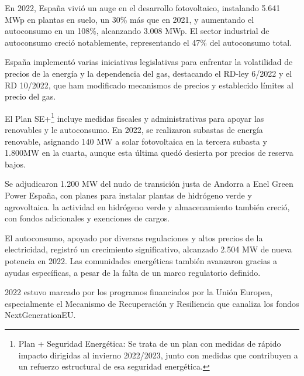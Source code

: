 En 2022, España vivió un auge en el desarrollo fotovoltaico, instalando 5.641 MWp en plantas en suelo, un 30\% más que en 2021, y aumentando el autoconsumo en un 108\%, alcanzando 3.008 MWp. El sector industrial de autoconsumo creció notablemente, representando el 47\% del autoconsumo total.

España implementó varias iniciativas legislativas para enfrentar la volatilidad de precios de la energía y la dependencia del gas, destacando el RD-ley 6/2022\cite{boe622} y el RD 10/2022\cite{boe1022}, que ham modificado mecanismos de precios y establecido límites al precio del gas.

El Plan SE+\footnote{Plan + Seguridad Energética: Se trata de un plan con medidas de rápido impacto dirigidas al invierno 2022/2023, junto con medidas que contribuyen a un refuerzo estructural de esa seguridad energética.}\cite{demografico22} incluye medidas fiscales y administrativas para apoyar las renovables y le autoconsumo. En 2022, se realizaron subastas de energía renovable, asignando 140 MW a solar fotovoltaica en la tercera subasta y 1.800MW en la cuarta, aunque esta última quedó desierta por precios de reserva bajos.

Se adjudicaron 1.200 MW del nudo de transición justa de Andorra a Enel Green Power España, con planes para instalar plantas de hidrógeno verde y agrovoltaica. la actividad en hidrógeno verde y almacenamiento también creció, con fondos adicionales y exenciones de cargos.

El autoconsumo, apoyado por diversas regulaciones y altos precios de la electricidad, registró un crecimiento significativo, alcanzado 2.504 MW de nueva potencia en 2022. Las comunidades energéticas también avanzaron gracias a ayudas específicas, a pesar de la falta de un marco regulatorio definido.

2022 estuvo marcado por los programos financiados por la Unión Europea, especialmente el Mecanismo de Recuperación y Resiliencia\cite{hacienda22} que canaliza los fondos NextGenerationEU\cite{union20}.
